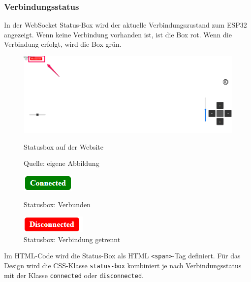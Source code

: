 \documentclass[ngerman,12pt,a4paper]{article}
\begin{document}
				\subsubsection*{Verbindungsstatus}
	
	In der WebSocket Status-Box wird der aktuelle Verbindungszustand zum ESP32 angezeigt. Wenn keine Verbindung vorhanden ist, ist die Box rot. Wenn die Verbindung erfolgt, wird die Box grün. 
\begin{figure}
	\begin{minipage}{1\textwidth}
		\centering
		\includegraphics[scale=0.4]{Pictures/status-web}
		\caption{Statusbox auf der Website}
		\label{fig:status-web}
		{\small Quelle: eigene Abbildung}
	\end{minipage}
	
	\vspace{1.5cm} %
	
	\begin{minipage}{0.3\linewidth}
		\centering
		\includegraphics{Pictures/status-green}
		\caption{Statusbox: Verbunden}
		\label{fig:status-green}
	\end{minipage}
	\hspace{0.1\linewidth}
	\begin{minipage}{0.3\linewidth}
		\centering
		\includegraphics{Pictures/status-red}
		\caption{Statusbox: Verbindung getrennt}
		\label{fig:status-red}
	\end{minipage}
\end{figure} \newpage 
Im HTML-Code wird die Status-Box als HTML \texttt{<span>}-Tag definiert. Für das Design wird die CSS-Klasse \texttt{status-box} kombiniert je nach Verbindungsstatus mit der Klasse \texttt{connected} oder \texttt{disconnected}. 
\end{document}
